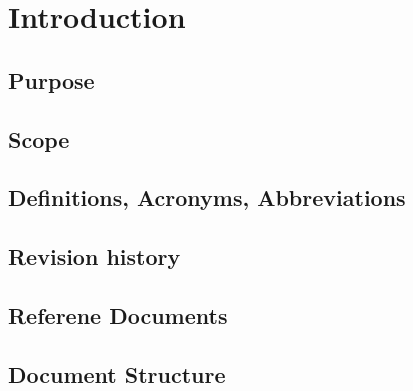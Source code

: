 

\section{Introduction}

\subsection{Purpose}

\newpage

\subsection{Scope}
\subsection{Definitions, Acronyms, Abbreviations}
\subsection{Revision history}
\subsection{Referene Documents}
\subsection{Document Structure}